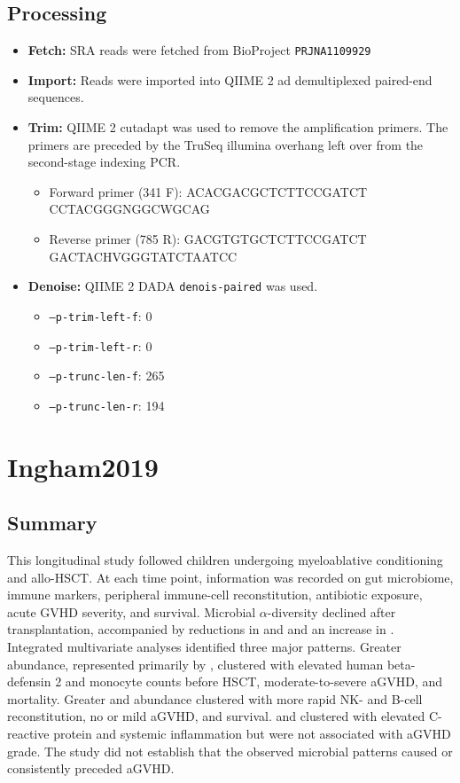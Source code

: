 \documentclass[11pt,a4paper]{article}
\begin{document}
\subsection{Processing}
\begin{itemize}
\item \textbf{Fetch:} SRA reads were fetched from BioProject \texttt{PRJNA1109929}
\item \textbf{Import:} Reads were imported into QIIME 2 ad demultiplexed paired-end sequences.
\item \textbf{Trim:} QIIME 2 cutadapt was used to remove the amplification primers. The primers are preceded by the TruSeq illumina overhang left over from the second-stage indexing PCR.
  \begin{itemize}
  \item Forward primer (341 F): ACACGACGCTCTTCCGATCT CCTACGGGNGGCWGCAG
  \item Reverse primer (785 R): GACGTGTGCTCTTCCGATCT GACTACHVGGGTATCTAATCC
  \end{itemize}
\item \textbf{Denoise:} QIIME 2 DADA \texttt{denois-paired} was used.
  \begin{itemize}
    \item \texttt{--p-trim-left-f}: 0
  \item \texttt{--p-trim-left-r}: 0
  \item \texttt{--p-trunc-len-f}: 265
  \item \texttt{--p-trunc-len-r}: 194
  \end{itemize}
\end{itemize}

\section{Ingham2019}
\subsection{Summary}

This longitudinal study followed children undergoing myeloablative conditioning and allo-HSCT. At each time point, information was recorded on gut microbiome, immune markers, peripheral immune-cell reconstitution, antibiotic exposure, acute GVHD severity, and survival. Microbial $\alpha$-diversity declined after transplantation, accompanied by reductions in \taxRuminococcaceae and \taxLachnospiraceae and an increase in \taxEnterococcaceae. Integrated multivariate analyses identified three major patterns. Greater \taxLactobacillaceae abundance, represented primarily by \taxLactobacillusSpp, clustered with elevated human beta-defensin 2 and monocyte counts before HSCT, moderate-to-severe aGVHD, and mortality. Greater \taxRuminococcaceae and \taxLachnospiraceae abundance clustered with more rapid NK- and B-cell reconstitution, no or mild aGVHD, and survival. \taxEnterobacteriaceae and \taxStaphylococcaceae clustered with elevated C-reactive protein and systemic inflammation but were not associated with aGVHD grade. The study did not establish that the observed microbial patterns caused or consistently preceded aGVHD.
\par
\end{document}
